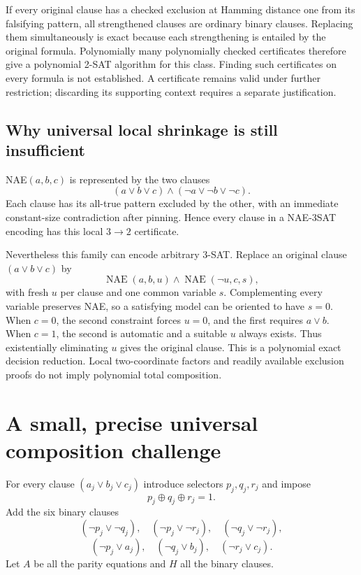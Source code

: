 \documentclass[11pt]{article}
\begin{document}
If every original clause has a checked exclusion at Hamming distance one from its
falsifying pattern, all strengthened clauses are ordinary binary clauses. Replacing
them simultaneously is exact because each strengthening is entailed by the original
formula. Polynomially many polynomially checked certificates therefore give a
polynomial 2-SAT algorithm for this class. Finding such certificates on every
formula is not established. A certificate remains valid under further restriction;
discarding its supporting context requires a separate justification.

\subsection{Why universal local shrinkage is still insufficient}
NAE$(a,b,c)$ is represented by the two clauses
\[
 (a\lor b\lor c)\land(\neg a\lor\neg b\lor\neg c).
\]
Each clause has its all-true pattern excluded by the other, with an immediate
constant-size contradiction after pinning. Hence every clause in a NAE-3SAT
encoding has this local $3\to2$ certificate.

Nevertheless this family can encode arbitrary 3-SAT. Replace an original clause
$(a\lor b\lor c)$ by
\[
 \operatorname{NAE}(a,b,u)\land\operatorname{NAE}(\neg u,c,s),
\]
with fresh $u$ per clause and one common variable $s$. Complementing every variable
preserves NAE, so a satisfying model can be oriented to have $s=0$. When $c=0$,
the second constraint forces $u=0$, and the first requires $a\lor b$. When $c=1$,
the second is automatic and a suitable $u$ always exists. Thus existentially
eliminating $u$ gives the original clause. This is a polynomial exact decision
reduction. Local two-coordinate factors and readily available exclusion proofs
do not imply polynomial total composition.

\section{A small, precise universal composition challenge}
For every clause $(a_j\lor b_j\lor c_j)$ introduce selectors $p_j,q_j,r_j$ and impose
\[
 p_j\oplus q_j\oplus r_j=1.
\]
Add the six binary clauses
\[
 (\neg p_j\lor\neg q_j),\quad(\neg p_j\lor\neg r_j),\quad
 (\neg q_j\lor\neg r_j),
\]
\[
 (\neg p_j\lor a_j),\quad(\neg q_j\lor b_j),\quad
 (\neg r_j\lor c_j).
\]
Let $A$ be all the parity equations and $H$ all the binary clauses.
\end{document}
